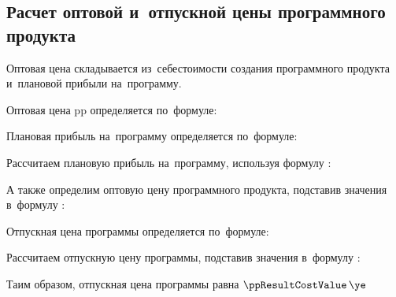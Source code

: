 \subsection{Расчет оптовой и~отпускной цены программного продукта}
\label{sec:economics:ppoptcost}

Оптовая цена складывается из~себестоимости создания программного продукта и~плановой прибыли на~программу.

Оптовая цена \gls{pp} определяется по~формуле:
\ppOptPriceEquation

Плановая прибыль на~программу определяется по~формуле:
\plannedSoftIncomeEquation

Рассчитаем плановую прибыль на~программу, используя формулу :
\plannedSoftIncomeFormulaApplied

А также определим оптовую цену программного продукта, подставив значения в~формулу :
\ppOptPriceFormulaApplied

Отпускная цена программы определяется по~формуле:
\ppResultCostEquation

Рассчитаем отпускную цену программы, подставив значения в~формулу :
\ppResultCostFormulaApplied

Таим образом, отпускная цена программы равна \(\ppResultCostValue \, \ye\)